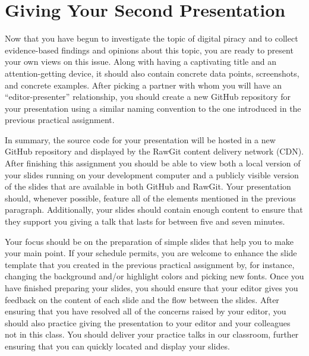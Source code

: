 

\usepackage[compact]{titlesec}




\vspace*{-.2in}
\section*{Giving Your Second Presentation}

Now that you have begun to investigate the topic of digital piracy and to collect evidence-based findings and opinions
about this topic, you are ready to present your own views on this issue. Along with having a captivating title and an
attention-getting device, it should also contain concrete data points, screenshots, and concrete examples. After picking
a partner with whom you will have an ``editor-presenter'' relationship, you should create a new GitHub repository for
your presentation using a similar naming convention to the one introduced in the previous practical assignment.

In summary, the source code for your presentation will be hosted in a new GitHub repository and displayed by the RawGit
content delivery network (CDN). After finishing this assignment you should be able to view both a local version of your
slides running on your development computer and a publicly visible version of the slides that are available in both
GitHub and RawGit. Your presentation should, whenever possible, feature all of the elements mentioned in the previous
paragraph. Additionally, your slides should contain enough content to ensure that they support you giving a talk that
lasts for between five and seven minutes.

Your focus should be on the preparation of simple slides that help you to make your main point. If your schedule
permits, you are welcome to enhance the slide template that you created in the previous practical assignment by, for
instance, changing the background and/or highlight colors and picking new fonts. Once you have finished preparing your
slides, you should ensure that your editor gives you feedback on the content of each slide and the flow between the
slides. After ensuring that you have resolved all of the concerns raised by your editor, you should also practice giving
the presentation to your editor and your colleagues not in this class. You should deliver your practice talks in our
classroom, further ensuring that you can quickly located and display your slides.


